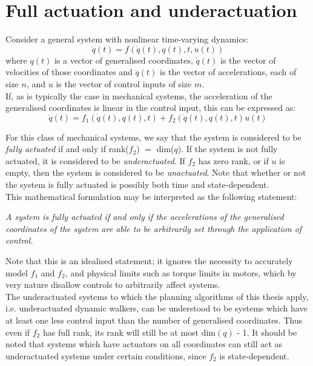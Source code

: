 \section{Full actuation and underactuation} \label{sec:underactuatedMaths}
Consider a general system with nonlinear time-varying dynamics:
\begin{equation}
	\ddot{q}(t) = f\left(\dot{q}(t), q(t), t, u(t)\right)
\end{equation}
where $q(t)$ is a vector of generalised coordinates, $\dot{q}(t)$ is the vector of velocities of those coordinates and $\ddot{q}(t)$ is the vector of accelerations, each of size $n$, and $u$ is the vector of control inputs of size $m$. \\

If, as is typically the case in mechanical systems, the acceleration of the generalised coordinates is linear in the control input, this can be expressed as: \\
\begin{equation}
	\ddot{q}(t) = f_1\left(\dot{q}(t), q(t), t\right) + f_2\left(\dot{q}(t), q(t), t\right)u(t)
\end{equation}

For this class of mechanical systems, we say that the system is considered to be \textit{fully actuated} if and only if rank($f_2$) $=$ dim($q$). If the system is not fully actuated, it is considered to be \textit{underactuated}. If $f_2$ has zero rank, or if $u$ is empty, then the system is considered to be \textit{unactuated}. Note that whether or not the system is fully actuated is possibly both time and state-dependent.  \\

This mathematical formulation may be interpreted as the following statement:

\textit{A system is fully actuated if and only if the accelerations of the generalised coordinates of the system are able to be arbitrarily set through the application of control.}

Note that this is an idealised statement; it ignores the necessity to accurately model $f_1$ and $f_2$, and physical limits such as torque limits in motors, which by very nature disallow controls to arbitrarily affect systems. \\

The underactuated systems to which the planning algorithms of this thesis apply, i.e. underactuated dynamic walkers, can be understood to be systems which have at least one less control input than the number of generalised coordinates. Thus even if $f_2$ has full rank, its rank will still be at most dim$(q)$ - 1. It should be noted that systems which have actuators on all coordinates can still act as underactuated systems under certain conditions, since $f_2$ is state-dependent.

